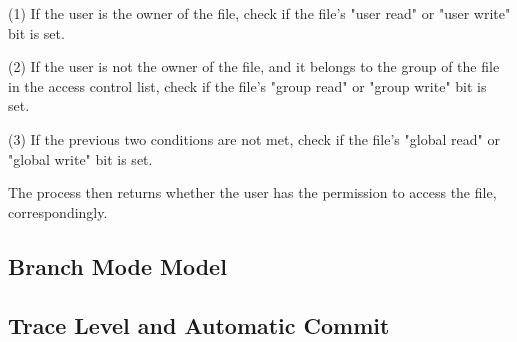 (1) If the user is the owner of the file, check if the file's "user read" or
"user write" bit is set.

(2) If the user is not the owner of the file, and it belongs to the group of the
file in the access control list, check if the file's "group read" or "group
write" bit is set.

(3) If the previous two conditions are not met, check if the file's "global
read" or "global write" bit is set.

The process then returns whether the user has the permission to access the file,
correspondingly.


\subsection{Branch Mode Model}



\subsection{Trace Level and Automatic Commit}

